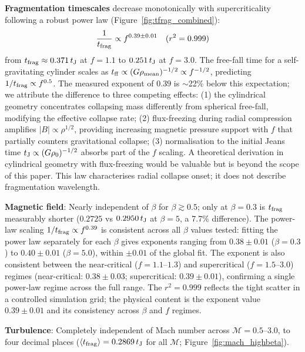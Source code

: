\documentclass[twoside,twocolumn]{mnras}
\begin{document}
\textbf{Fragmentation timescales} decrease monotonically with supercriticality following
a robust power law (Figure~\ref{fig:tfrag_combined}):
\begin{equation}
\frac{1}{t_{\rm frag}} \propto f^{0.39 \pm 0.01} \quad (r^2 = 0.999)
\label{eq:powerlaw}
\end{equation}
from $t_{\rm frag} \approx 0.371\,t_{\rm J}$ at $f = 1.1$ to $0.251\,t_{\rm J}$ at
$f = 3.0$. The free-fall time for a self-gravitating cylinder scales as
$t_{\rm ff} \propto (G\rho_{\rm mean})^{-1/2} \propto f^{-1/2}$, predicting
$1/t_{\rm frag} \propto f^{0.5}$. The measured exponent of $0.39$ is $\sim$22\% below
this expectation; we attribute the difference to three competing effects: (1) the
cylindrical geometry concentrates collapsing mass differently from spherical free-fall,
modifying the effective collapse rate; (2) flux-freezing during radial compression
amplifies $|B| \propto \rho^{1/2}$, providing increasing magnetic pressure support
with $f$ that partially counters gravitational collapse; (3) normalisation to the
initial Jeans time $t_{\rm J} \propto (G\rho_0)^{-1/2}$ absorbs part of the $f$
scaling. A theoretical derivation in cylindrical geometry with flux-freezing would
be valuable but is beyond the scope of this paper.
This law characterises radial collapse onset; it does not describe fragmentation wavelength.

\textbf{Magnetic field}: Nearly independent of $\beta$ for $\beta \gtrsim 0.5$; only
at $\beta = 0.3$ is $t_{\rm frag}$ measurably shorter ($0.2725$ vs $0.2950\,t_{\rm J}$
at $\beta = 5$, a 7.7\% difference). The power-law scaling $1/t_{\rm frag} \propto f^{0.39}$
is consistent across all $\beta$ values tested: fitting the power law separately for each
$\beta$ gives exponents ranging from $0.38 \pm 0.01$ ($\beta = 0.3$) to $0.40 \pm 0.01$
($\beta = 5.0$), within $\pm 0.01$ of the global fit. The exponent is also consistent
between the near-critical ($f = 1.1$--$1.3$) and supercritical ($f = 1.5$--$3.0$)
regimes (near-critical: $0.38 \pm 0.03$; supercritical: $0.39 \pm 0.01$), confirming
a single power-law regime across the full range. The $r^2 = 0.999$ reflects the tight
scatter in a controlled simulation grid; the physical content is the exponent value
$0.39 \pm 0.01$ and its consistency across $\beta$ and $f$ regimes.

\textbf{Turbulence}: Completely independent of Mach number across $\mathcal{M} = 0.5$--$3.0$,
to four decimal places ($\langle t_{\rm frag} \rangle = 0.2869\,t_{\rm J}$ for all $\mathcal{M}$;
Figure~\ref{fig:mach_highbeta}).
\end{document}
